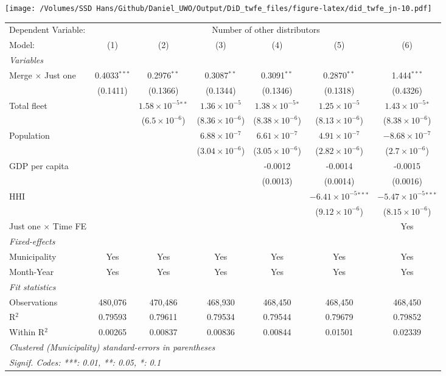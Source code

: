 \documentclass[
]{article}
\begin{document}
\texttt{[image: /Volumes/SSD Hans/Github/Daniel\_UWO/Output/DiD\_twfe\_files/figure-latex/did\_twfe\_jn-10.pdf]}

\begin{tabular}{lcccccc}
\tabularnewline\midrule\midrule
Dependent Variable:&\multicolumn{6}{c}{Number of other distributors}\\
Model:&(1) & (2) & (3) & (4) & (5) & (6)\\
\midrule \emph{Variables}&   &   &   &   &   &  \\
Merge $\times $ Just one & 0.4033$^{***}$ & 0.2976$^{**}$ & 0.3087$^{**}$ & 0.3091$^{**}$ & 0.2870$^{**}$ & 1.444$^{***}$\\
  &(0.1411) & (0.1366) & (0.1344) & (0.1346) & (0.1318) & (0.4326)\\
Total fleet &    & $1.58\times 10^{-5}$$^{**}$ & $1.36\times 10^{-5}$ & $1.38\times 10^{-5}$$^{*}$ & $1.25\times 10^{-5}$ & $1.43\times 10^{-5}$$^{*}$\\
  &   & ($6.5\times 10^{-6}$) & ($8.36\times 10^{-6}$) & ($8.38\times 10^{-6}$) & ($8.13\times 10^{-6}$) & ($8.38\times 10^{-6}$)\\
Population &    &    & $6.88\times 10^{-7}$ & $6.61\times 10^{-7}$ & $4.91\times 10^{-7}$ & $-8.68\times 10^{-7}$\\
  &   &    & ($3.04\times 10^{-6}$) & ($3.05\times 10^{-6}$) & ($2.82\times 10^{-6}$) & ($2.7\times 10^{-6}$)\\
GDP per capita &    &    &    & -0.0012 & -0.0014 & -0.0015\\
  &   &    &    & (0.0013) & (0.0014) & (0.0016)\\
HHI &    &    &    &    & $-6.41\times 10^{-5}$$^{***}$ & $-5.47\times 10^{-5}$$^{***}$\\
  &   &    &    &    & ($9.12\times 10^{-6}$) & ($8.15\times 10^{-6}$)\\
Just one $\times$ Time FE &  &  &  &  &  & Yes\\
\midrule \emph{Fixed-effects}&   &   &   &   &   &  \\
Municipality & Yes & Yes & Yes & Yes & Yes & Yes\\
Month-Year & Yes & Yes & Yes & Yes & Yes & Yes\\
\midrule \emph{Fit statistics}&  & & & & & \\
Observations & 480,076&470,486&468,930&468,450&468,450&468,450\\
R$^2$ & 0.79593&0.79611&0.79534&0.79544&0.79679&0.79852\\
Within R$^2$ & 0.00265&0.00837&0.00836&0.00844&0.01501&0.02339\\
\midrule\midrule\multicolumn{7}{l}{\emph{Clustered (Municipality) standard-errors in parentheses}}\\
\multicolumn{7}{l}{\emph{Signif. Codes: ***: 0.01, **: 0.05, *: 0.1}}\\
\end{tabular}
\end{document}
